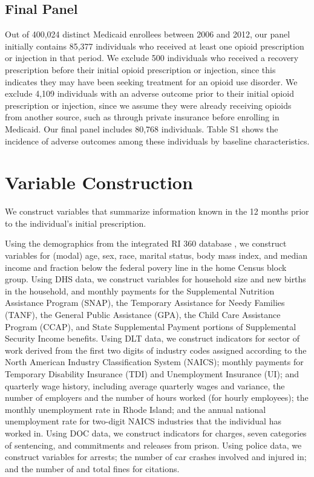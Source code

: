 \documentclass[9pt,twoside]{pnas-new}
\begin{document}
\subsection{Final Panel}

Out of 400,024 distinct Medicaid enrollees between 2006 and 2012, our panel initially contains 85,377 individuals who received at least one opioid prescription or injection in that period. We exclude 500 individuals who received a recovery prescription before their initial opioid prescription or injection, since this indicates they may have been seeking treatment for an opioid use disorder. We exclude 4,109 individuals with an adverse outcome prior to their initial opioid prescription or injection, since we assume they were already receiving opioids from another source, such as through private insurance before enrolling in Medicaid. Our final panel includes 80,768 individuals. Table S1 shows the incidence of adverse outcomes among these individuals by baseline characteristics.

\section{Variable Construction}

We construct variables that summarize information known in the 12 months prior to the individual's initial prescription.

Using the demographics from the integrated RI 360 database \cite{hastings}, we construct variables for (modal) age, sex, race, marital status, body mass index, and median income and fraction below the federal povery line in the home Census block group. Using DHS data, we construct variables for household size and new births in the household, and monthly payments for the Supplemental Nutrition Assistance Program (SNAP), the Temporary Assistance for Needy Families (TANF), the General Public Assistance (GPA), the Child Care Assistance Program (CCAP), and State Supplemental Payment portions of Supplemental Security Income benefits. Using DLT data, we construct indicators for sector of work derived from the first two digits of industry codes assigned according to the North American Industry Classification System (NAICS); monthly payments for Temporary Disability Insurance (TDI) and Unemployment Insurance (UI); and quarterly wage history, including average quarterly wages and variance, the number of employers and the number of hours worked (for hourly employees); the monthly unemployment rate in Rhode Island; and the annual national unemployment rate for two-digit NAICS industries that the individual has worked in. Using DOC data, we construct indicators for charges, seven categories of sentencing, and commitments and releases from prison. Using police data, we construct variables for arrests; the number of car crashes involved and injured in; and the number of and total fines for citations.
\end{document}

